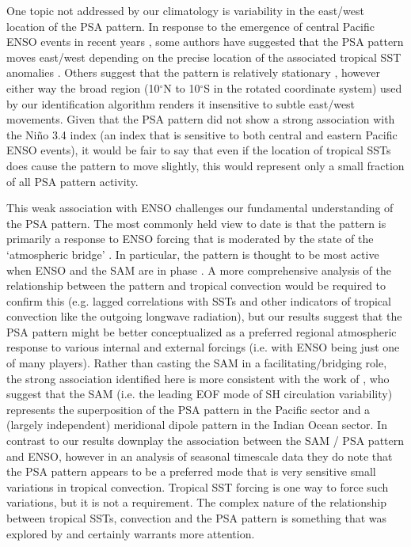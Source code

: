 One topic not addressed by our climatology is variability in the east/west location of the PSA pattern. In response to the emergence of central Pacific ENSO events in recent years \citep[e.g.][]{Ashok2007}, some authors have suggested that the PSA pattern moves east/west depending on the precise location of the associated tropical SST anomalies \citep[e.g.][]{Sun2013,Wilson2014,Ciasto2015}. Others suggest that the pattern is relatively stationary \citep[e.g.][]{Liu2007,Ding2012}, however either way the broad region (10$^{\circ}$N to 10$^{\circ}$S in the rotated coordinate system) used by our identification algorithm renders it insensitive to subtle east/west movements. Given that the PSA pattern did not show a strong association with the Ni\~{n}o 3.4 index (an index that is sensitive to both central and eastern Pacific ENSO events), it would be fair to say that even if the location of tropical SSTs does cause the pattern to move slightly, this would represent only a small fraction of all PSA pattern activity. 

This weak association with ENSO challenges our fundamental understanding of the PSA pattern. The most commonly held view to date is that the pattern is primarily a response to ENSO forcing \citep[e.g.][]{Mo2001} that is moderated by the state of the `atmospheric bridge' \citep{Liu2007}. In particular, the pattern is thought to be most active when ENSO and the SAM are in phase \citep{Fogt2006}. A more comprehensive analysis of the relationship between the pattern and tropical convection would be required to confirm this (e.g. lagged correlations with SSTs and other indicators of tropical convection like the outgoing longwave radiation), but our results suggest that the PSA pattern might be better conceptualized as a preferred regional atmospheric response to various internal and external forcings (i.e. with ENSO being just one of many players). Rather than casting the SAM in a facilitating/bridging role, the strong association identified here is more consistent with the work of \citet{Ding2012}, who suggest that the SAM (i.e. the leading EOF mode of SH circulation variability) represents the superposition of the PSA pattern in the Pacific sector and a (largely independent) meridional dipole pattern in the Indian Ocean sector. In contrast to \citet{Ding2012} our results downplay the association between the SAM / PSA pattern and ENSO, however in an analysis of seasonal timescale data they do note that the PSA pattern appears to be a preferred mode that is very sensitive small variations in tropical convection. Tropical SST forcing is one way to force such variations, but it is not a requirement. The complex nature of the relationship between tropical SSTs, convection and the PSA pattern is something that was explored by \citet{Harangozo2004} and certainly warrants more attention.  


